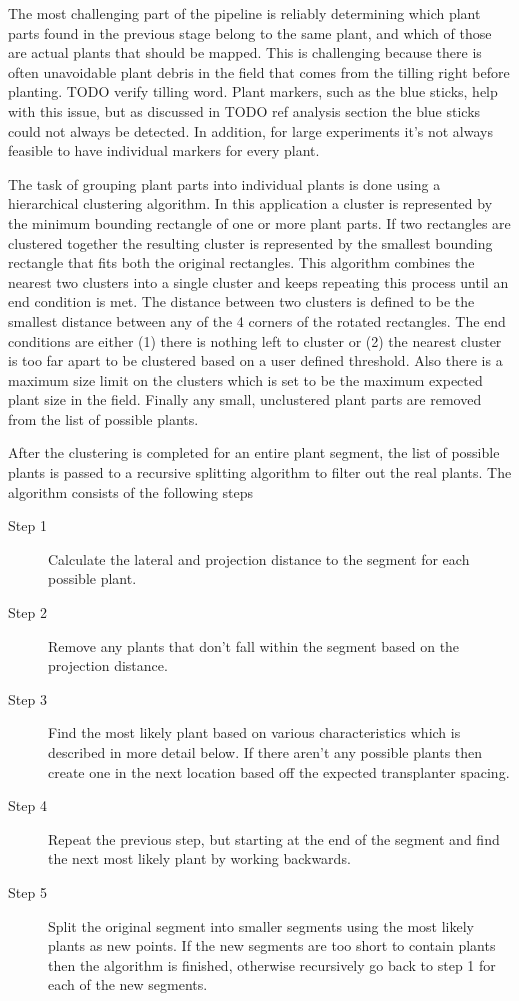 The most challenging part of the pipeline is reliably determining which plant parts found in the previous stage belong to the same plant, and which of those are actual plants that should be mapped.  This is challenging because there is often unavoidable plant debris in the field that comes from the tilling right before planting. TODO verify tilling word.  Plant markers, such as the blue sticks, help with this issue, but as discussed in TODO ref analysis section the blue sticks could not always be detected.  In addition, for large experiments it's not always feasible to have individual markers for every plant.  

The task of grouping plant parts into individual plants is done using a hierarchical clustering algorithm.  In this application a cluster is represented by the minimum bounding rectangle of one or more plant parts.  If two rectangles are clustered together the resulting cluster is represented by the smallest bounding rectangle that fits both the original rectangles.  This algorithm combines the nearest two clusters into a single cluster and keeps repeating this process until an end condition is met.  The distance between two clusters is defined to be the smallest distance between any of the 4 corners of the rotated rectangles.   The end conditions are either (1) there is nothing left to cluster or (2) the nearest cluster is too far apart to be clustered based on a user defined threshold.  Also there is a maximum size limit on the clusters which is set to be the maximum expected plant size in the field.  Finally any small, unclustered plant parts are removed from the list of possible plants. 

After the clustering is completed for an entire plant segment, the list of possible plants is passed to a recursive splitting algorithm to filter out the real plants. The algorithm consists of the following steps

\begin{description}
\item[Step 1] Calculate the lateral and projection distance to the segment for each possible plant.  
\item[Step 2] Remove any plants that don't fall within the segment based on the projection distance.
\item[Step 3] Find the most likely plant based on various characteristics which is described in more detail below.  If there aren't any possible plants then create one in the next location based off the expected transplanter spacing.  
\item[Step 4] Repeat the previous step, but starting at the end of the segment and find the next most likely plant by working backwards.
\item[Step 5] Split the original segment into smaller segments using the most likely plants as new points.  If the new segments are too short to contain plants then the algorithm is finished, otherwise recursively go back to step 1 for each of the new segments.
\end{description}

